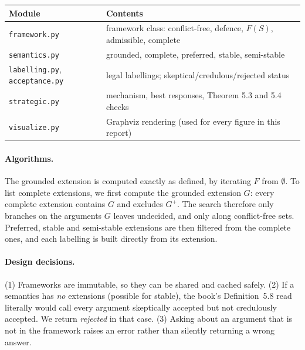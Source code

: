 \documentclass[11pt,a4paper]{article}
\newcommand{\code}[1]{\texttt{#1}}
\begin{document}
\begin{center}
\small
\begin{tabularx}{\linewidth}{@{}lX@{}}
\toprule
Module & Contents \\
\midrule
\code{framework.py} & framework class: conflict-free, defence, $F(S)$, admissible, complete \\
\code{semantics.py} & grounded, complete, preferred, stable, semi-stable \\
\code{labelling.py}, \code{acceptance.py} & legal labellings; skeptical/credulous/rejected status \\
\code{strategic.py} & mechanism, best responses, Theorem 5.3 and 5.4 checks \\
\code{visualize.py} & Graphviz rendering (used for every figure in this report) \\
\bottomrule
\end{tabularx}
\end{center}

\paragraph{Algorithms.} The grounded extension is computed exactly as
defined, by iterating $F$ from $\emptyset$. To list complete extensions, we
first compute the grounded extension $G$: every complete extension contains
$G$ and excludes $G^+$. The search therefore only branches on the arguments
$G$ leaves undecided, and only along conflict-free sets. Preferred, stable and
semi-stable extensions are then filtered from the complete ones, and each
labelling is built directly from its extension.

\paragraph{Design decisions.}
(1) Frameworks are immutable, so they can be shared and cached safely.
(2) If a semantics has \emph{no} extensions (possible for stable), the book's
Definition~5.8 read literally would call every argument skeptically accepted
but not credulously accepted. We return \emph{rejected} in that case.
(3) Asking about an argument that is not in the framework raises an error
rather than silently returning a wrong answer.
\end{document}
